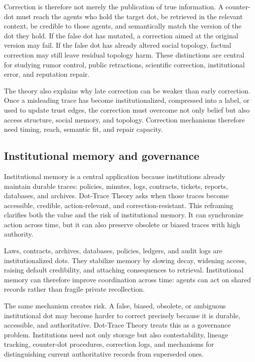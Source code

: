 \documentclass[11pt]{article}
\theoremstyle{remark}
\begin{document}
Correction is therefore not merely the publication of true information. A counter-dot must reach the agents who hold the target dot, be retrieved in the relevant context, be credible to those agents, and semantically match the version of the dot they hold. If the false dot has mutated, a correction aimed at the original version may fail. If the false dot has already altered social topology, factual correction may still leave residual topology harm. These distinctions are central for studying rumor control, public retractions, scientific correction, institutional error, and reputation repair.

The theory also explains why late correction can be weaker than early correction. Once a misleading trace has become institutionalized, compressed into a label, or used to update trust edges, the correction must overcome not only belief but also access structure, social memory, and topology. Correction mechanisms therefore need timing, reach, semantic fit, and repair capacity.

\subsection{Institutional memory and governance}\label{institutional-memory-and-governance}

Institutional memory is a central application because institutions already maintain durable traces: policies, minutes, logs, contracts, tickets, reports, databases, and archives. Dot-Trace Theory asks when those traces become accessible, credible, action-relevant, and correction-resistant. This reframing clarifies both the value and the risk of institutional memory. It can synchronize action across time, but it can also preserve obsolete or biased traces with high authority.

Laws, contracts, archives, databases, policies, ledgers, and audit logs are institutionalized dots. They stabilize memory by slowing decay, widening access, raising default credibility, and attaching consequences to retrieval. Institutional memory can therefore improve coordination across time: agents can act on shared records rather than fragile private recollection.

The same mechanism creates risk. A false, biased, obsolete, or ambiguous institutional dot may become harder to correct precisely because it is durable, accessible, and authoritative. Dot-Trace Theory treats this as a governance problem. Institutions need not only storage but also contestability, lineage tracking, counter-dot procedures, correction logs, and mechanisms for distinguishing current authoritative records from superseded ones.
\end{document}
